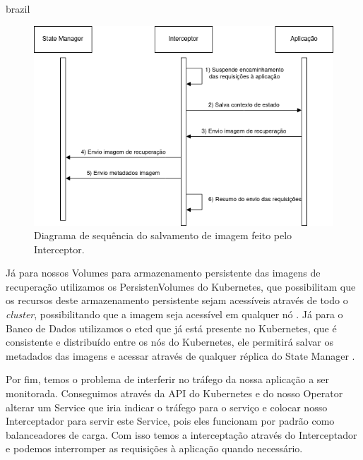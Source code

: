 \begin{otherlanguage*}{brazil}
\begin{figure}[h]
\centering
\includegraphics[scale=0.46]{images/interceptor-checkpoint.png}
\caption{Diagrama de sequência do salvamento de imagem feito pelo Interceptor.}
\label{fig:interceptor-checkpoint}
\end{figure}

Já para nossos Volumes para armazenamento persistente das imagens de recuperação
utilizamos os PersistenVolumes do Kubernetes, que possibilitam que os recursos
deste armazenamento persistente sejam acessíveis através de todo o \textit{cluster},
possibilitando que a imagem seja acessível em qualquer nó \cite{kubernetes:persistent-volumes}.
Já para o Banco de Dados utilizamos o etcd que já está presente no Kubernetes, que é
consistente e distribuído entre os nós do Kubernetes, ele permitirá salvar os metadados
das imagens e acessar através de qualquer réplica do State Manager \cite{etcd}
\cite{kubernetes:etcd}.

Por fim, temos o problema de interferir no tráfego da nossa aplicação a ser monitorada.
Conseguimos através da API do Kubernetes e do nosso Operator alterar um Service que iria
indicar o tráfego para o serviço e colocar nosso Interceptador para servir este Service,
pois eles funcionam por padrão como balanceadores de carga. Com isso temos a interceptação
através do Interceptador e podemos interromper as requisições à aplicação quando necessário.

\end{otherlanguage*}
